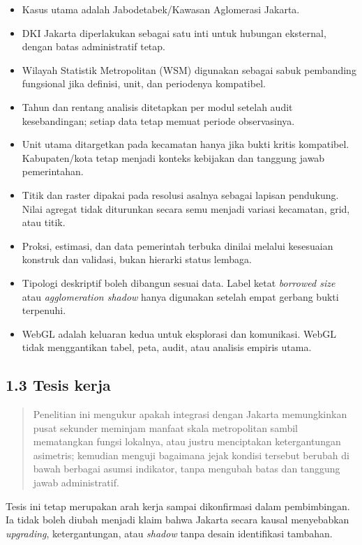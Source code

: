 \documentclass[
  indonesian,
  11pt,
]{article}
\providecommand{\tightlist}{%
  \setlength{\itemsep}{0pt}\setlength{\parskip}{0pt}}
\renewcommand{\tightlist}{%
  \setlength{\itemsep}{0.22em}%
  \setlength{\parskip}{0pt}%
}
\begin{document}
\begin{itemize}
\tightlist
\item
  Kasus utama adalah Jabodetabek/Kawasan Aglomerasi Jakarta.
\item
  DKI Jakarta diperlakukan sebagai satu inti untuk hubungan eksternal,
  dengan batas administratif tetap.
\item
  Wilayah Statistik Metropolitan (WSM) digunakan sebagai sabuk
  pembanding fungsional jika definisi, unit, dan periodenya kompatibel.
\item
  Tahun dan rentang analisis ditetapkan per modul setelah audit
  kesebandingan; setiap data tetap memuat periode observasinya.
\item
  Unit utama ditargetkan pada kecamatan hanya jika bukti kritis
  kompatibel. Kabupaten/kota tetap menjadi konteks kebijakan dan
  tanggung jawab pemerintahan.
\item
  Titik dan raster dipakai pada resolusi asalnya sebagai lapisan
  pendukung. Nilai agregat tidak diturunkan secara semu menjadi variasi
  kecamatan, grid, atau titik.
\item
  Proksi, estimasi, dan data pemerintah terbuka dinilai melalui
  kesesuaian konstruk dan validasi, bukan hierarki status lembaga.
\item
  Tipologi deskriptif boleh dibangun sesuai data. Label ketat
  \emph{borrowed size} atau \emph{agglomeration shadow} hanya digunakan
  setelah empat gerbang bukti terpenuhi.
\item
  WebGL adalah keluaran kedua untuk eksplorasi dan komunikasi. WebGL
  tidak menggantikan tabel, peta, audit, atau analisis empiris utama.
\end{itemize}

\subsection{1.3 Tesis kerja}\label{tesis-kerja}

\begin{quote}
Penelitian ini mengukur apakah integrasi dengan Jakarta memungkinkan
pusat sekunder meminjam manfaat skala metropolitan sambil mematangkan
fungsi lokalnya, atau justru menciptakan ketergantungan asimetris;
kemudian menguji bagaimana jejak kondisi tersebut berubah di bawah
berbagai asumsi indikator, tanpa mengubah batas dan tanggung jawab
administratif.
\end{quote}

Tesis ini tetap merupakan arah kerja sampai dikonfirmasi dalam
pembimbingan. Ia tidak boleh diubah menjadi klaim bahwa Jakarta secara
kausal menyebabkan \emph{upgrading}, ketergantungan, atau \emph{shadow}
tanpa desain identifikasi tambahan.
\end{document}
